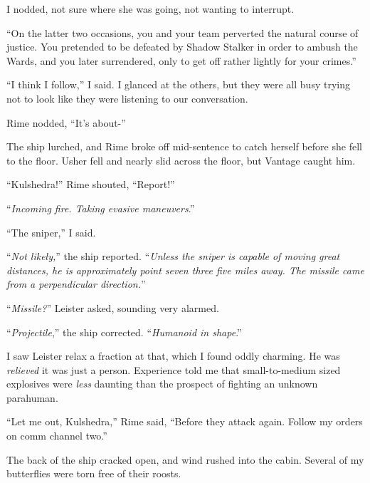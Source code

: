 I nodded, not sure where she was going, not wanting to interrupt.



``On the latter two occasions, you and your team perverted the natural course of justice.  You pretended to be defeated by Shadow Stalker in order to ambush the Wards, and you later surrendered, only to get off rather lightly for your crimes.''



``I think I follow,'' I said.  I glanced at the others, but they were all busy trying not to look like they were listening to our conversation.



Rime nodded, ``It's about-''



The ship lurched, and Rime broke off mid-sentence to catch herself before she fell to the floor.  Usher fell and nearly slid across the floor, but Vantage caught him.



``Kulshedra!'' Rime shouted, ``Report!''



``\emph{Incoming fire.  Taking evasive maneuvers}.''



``The sniper,'' I said.



``\emph{Not likely,}'' the ship reported.  ``\emph{Unless the sniper is capable of moving great distances, he is approximately point seven three five miles away.  The missile came from a perpendicular direction.}''



``\emph{Missile?}'' Leister asked, sounding very alarmed.



``\emph{Projectile},'' the ship corrected.  ``\emph{Humanoid in shape}.''



I saw Leister relax a fraction at that, which I found oddly charming.  He was \emph{relieved} it was just a person.  Experience told me that small-to-medium sized explosives were \emph{less} daunting than the prospect of fighting an unknown parahuman.



``Let me out, Kulshedra,'' Rime said, ``Before they attack again.  Follow my orders on comm channel two.''



The back of the ship cracked open, and wind rushed into the cabin.  Several of my butterflies were torn free of their roosts.



